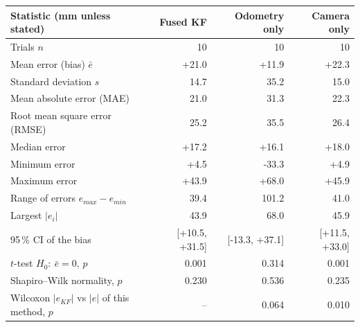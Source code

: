 \begin{tabular}{@{}lrrr@{}}\toprule
Statistic (mm unless stated) & Fused KF & Odometry only & Camera only\\\midrule
Trials $n$ & 10 & 10 & 10\\
Mean error (bias) $\bar e$ & +21.0 & +11.9 & +22.3\\
Standard deviation $s$ & 14.7 & 35.2 & 15.0\\
Mean absolute error (MAE) & 21.0 & 31.3 & 22.3\\
Root mean square error (RMSE) & 25.2 & 35.5 & 26.4\\
Median error & +17.2 & +16.1 & +18.0\\
Minimum error & +4.5 & -33.3 & +4.9\\
Maximum error & +43.9 & +68.0 & +45.9\\
Range of errors $e_{max}-e_{min}$ & 39.4 & 101.2 & 41.0\\
Largest $|e_i|$ & 43.9 & 68.0 & 45.9\\
95\,\% CI of the bias & [+10.5, +31.5] & [-13.3, +37.1] & [+11.5, +33.0]\\
$t$-test $H_0{:}\ \bar e=0$, $p$ & 0.001 & 0.314 & 0.001\\
Shapiro--Wilk normality, $p$ & 0.230 & 0.536 & 0.235\\
\midrule
Wilcoxon $|e_{KF}|$ vs $|e|$ of this method, $p$ & -- & 0.064 & 0.010\\
\bottomrule\end{tabular}
